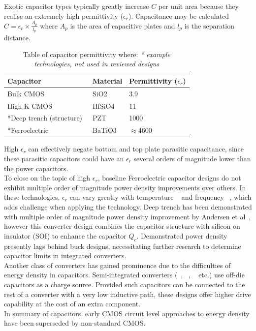 \documentclass[letterpaper,twocolumn,10pt]{article}
\begin{document}
Exotic capacitor types typically greatly increase $C$ per unit area because they realise an extremely high permittivity ($\epsilon_r$). Capacitance may be calculated $C = \epsilon_r \times \frac{A_p}{l_p}$ where $A_p$ is the area of capacitive plates and $l_p$ is the separation distance. 
\begin{table}
    \begin{tabular}{|l|l|l|}
    \hline
    Capacitor               & Material & Permittivity ($\epsilon_r$) \\ \hline
    Bulk CMOS~\cite{Robertson2004}               & SiO2     & 3.9          \\ \hline
    High K CMOS~\cite{Robertson2004}             & HfSiO4   & 11           \\ \hline
    *Deep trench (structure)~\cite{Johari2009} & PZT      & 1000         \\ \hline
    *Ferroelectric~\cite{Lee2004}			& BaTiO3      & $\approx$4600         \\ \hline    
    \end{tabular}
    \caption{Table of capacitor permittivity where: \textit{* example technologies, not used in reviewed designs}}
    \label{PermittivityTable}
\end{table}
High $\epsilon_r$ can effectively negate bottom and top plate parasitic capacitance, since these parasitic capacitors could have an $\epsilon_r$ several orders of magnitude lower than the power capacitors.\\ 
To close on the topic of high $\epsilon_r$, baseline Ferroelectric capacitor designs do not exhibit multiple order of magnitude power density improvements over others. In these technologies, $\epsilon_r$ can vary greatly with temperature ~\cite{Lee2004} and frequency ~\cite{Callister2012}, which adds challenge when applying the technology. Deep trench has been demonstrated with multiple order of magnitude power density improvement by Andersen et al~\cite{Andersen2013}, however this converter design combines the capacitor structure with silicon on insulator (SOI) to enhance the capacitor $Q_c$. %
Demonstrated power density presently lags behind buck designs, necessitating further research to determine capacitor limits in integrated converters.\\
Another class of converters has gained prominence due to the difficulties of energy density in capacitors. Semi-integrated converters (~\cite{Pilawa2012}, ~\cite{Bathily2012}, ~\cite{Ng2012} etc.) use off-die capacitors as a charge source. Provided such capacitors can be connected to the rest of a converter with a very low inductive path, these designs offer higher drive capability at the cost of an extra component.\\
\indent In summary of capacitors, early CMOS circuit level approaches to energy density have been superseded by non-standard CMOS. %
\end{document}
